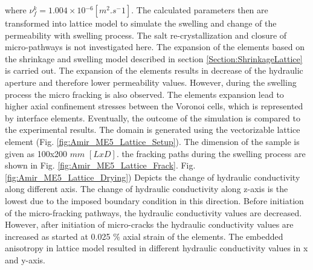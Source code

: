 where $\nu_f^{k}=1.004\times{10}{^{-6} [m^2.s^-1]}$. The calculated parameters then are transformed into lattice model to simulate the swelling and change of the permeability with swelling process. The salt re-crystallization and closure of micro-pathways is not investigated here. The expansion of the elements based on the shrinkage and swelling model described in section \ref{Section:ShrinkageLattice} is carried out. The expansion of the elements results in decrease of the hydraulic aperture and therefore lower permeability values. However, during the swelling process the micro fracking is also observed. The elements expansion lead to higher axial confinement stresses between the Voronoi cells, which is represented by interface elements.  Eventually, the outcome of the simulation is compared to the experimental results. The domain is generated using the vectorizable lattice element (Fig. \ref{fig:Amir_ME5_Lattice_Setup}). The dimension of the sample is given as 100x200 $mm$ $[LxD]$. the fracking paths during the swelling process are shown in Fig.
\ref{fig:Amir_ME5_Lattice_Frack}. Fig. \ref{fig:Amir_ME5_Lattice_Drying}) Depicts the change of hydraulic conductivity along different axis. The change of hydraulic conductivity along z-axis is the lowest due to the imposed boundary condition in this direction. Before initiation of the micro-fracking pathways, the hydraulic conductivity values are decreased. However, after initiation of micro-cracks the hydraulic conductivity values are increased as started at 0.025 $\%$ axial strain of the elements. The embedded anisotropy in lattice model resulted in different hydraulic conductivity values in x and y-axis.

